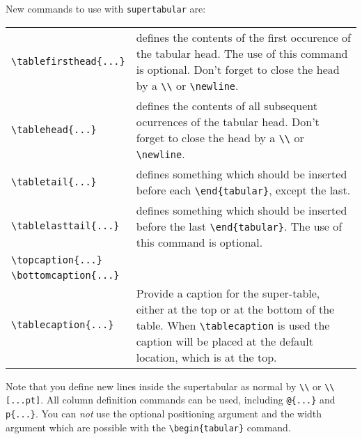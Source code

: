New commands to use with \verb|supertabular| are:
\begin{center}
\begin{tabular}{l p{8cm}}
\verb|\tablefirsthead{...}| & defines the contents of the first occurence of
                            the tabular head.
                            The use of this command is optional.
                         Don't forget to close the head by a \verb|\\|
                         or \verb|\newline|.                        \\
\verb|\tablehead{...}| & defines the contents of all subsequent ocurrences of
                         the tabular head.
                         Don't forget to close the head by a \verb|\\|
                         or \verb|\newline|.                        \\
\verb|\tabletail{...}| & defines something which should be inserted
                         before each \verb|\end{tabular}|, except the last.\\
\verb|\tablelasttail{...}| & defines something which should be inserted
                             before the last \verb|\end{tabular}|.
                             The use of this command is optional.\\
\verb|\topcaption{...}|     &\\
\verb|\bottomcaption{...}|  &\\
\verb|\tablecaption{...}|   & Provide a caption for the super-table, either
                              at the top or at the bottom of the table. When
                              \verb|\tablecaption| is used the caption will
                              be placed at the default location, which is at
                              the top.\\
\end{tabular}
\end{center}
Note that you define new lines inside the supertabular as normal by
\verb|\\| or \verb|\\[...pt]|. All column definition commands can be
used, including \verb|@{...}| and \verb|p{...}|. You can {\it not} use
the optional positioning argument and the width argument which are
possible with the \verb|\begin{tabular}| command.

